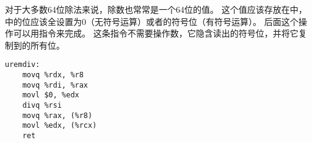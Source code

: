 {{        对于大多数64位除法来说，除数也常常是一个64位的值。
        这个值应该存放在中，中的位应该全设置为0（无符号运算）或者的符号位（有符号运算）。
        后面这个操作可以用指令来完成。
        这条指令不需要操作数，它隐含读出的符号位，并将它复制到的所有位。

        \begin{practicec}
            \begin{lstlisting}
uremdiv:
    movq %rdx, %r8
    movq %rdi, %rax
    movl $0, %edx
    divq %rsi
    movq %rax, (%r8)
    movl %edx, (%rcx)
    ret
            \end{lstlisting}
        \end{practicec}
    }
}
